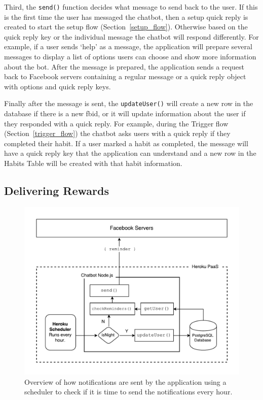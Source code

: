 Third, the \verb|send()| function decides what message to send back to the user. If this is the first time the user has messaged the chatbot, then a setup quick reply is created to start the setup flow (Section~\ref{setup_flow}). Otherwise based on the quick reply key or the individual message the chatbot will respond differently. For example, if a user sends `help' as a message, the application will prepare several messages to display a list of options users can choose and show more information about the bot. After the message is prepared, the application sends a request back to Facebook servers containing a regular message or a quick reply object with options and quick reply keys.

Finally after the message is sent, the \verb|updateUser()| will create a new row in the database if there is a new fbid, or it will update information about the user if they responded with a quick reply. For example, during the Trigger flow (Section~\ref{trigger_flow}) the chatbot asks users with a quick reply if they completed their habit. If a user marked a habit as completed, the message will have a quick reply key that the application can understand and a new row in the Habits Table will be created with that habit information.

\subsection{Delivering Rewards}

\begin{figure}[H]
    \centering
    \includegraphics[width=6in]{../resources/diagrams/diagram-delivering-rewards.pdf}
    \caption{Overview of how notifications are sent by the application using a scheduler to check if it is time to send the notifications every hour.}
    \label{fig:prototype_sending_notifications}
\end{figure}

